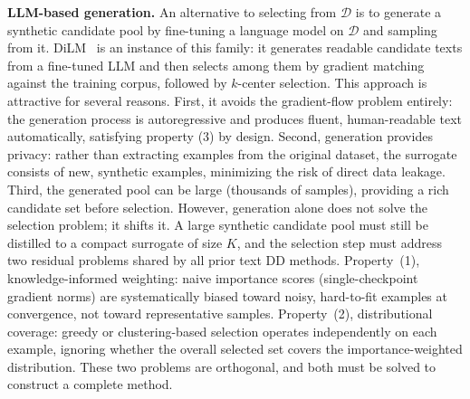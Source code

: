\begin{foldable}
  \textbf{\ac{LLM}-based generation.}
  An alternative to selecting from $\mathcal{D}$ is to generate a synthetic candidate pool by fine-tuning a language model on $\mathcal{D}$ and sampling from it.
  DiLM~\cite{maekawa2024dilm} is an instance of this family: it generates readable candidate texts from a fine-tuned \ac{LLM} and then selects among them by gradient matching against the training corpus, followed by $k$-center selection.
  This approach is attractive for several reasons.
  First, it avoids the gradient-flow problem entirely: the generation process is autoregressive and produces fluent, human-readable text automatically, satisfying property (3) by design.
  Second, generation provides privacy: rather than extracting examples from the original dataset, the surrogate consists of new, synthetic examples, minimizing the risk of direct data leakage.
  Third, the generated pool can be large (thousands of samples), providing a rich candidate set before selection.
  However, generation alone does not solve the selection problem; it shifts it.
  A large synthetic candidate pool must still be distilled to a compact surrogate of size $K$, and the selection step must address two residual problems shared by all prior text \ac{DD} methods.
  Property~(1), knowledge-informed weighting: naive importance scores (single-checkpoint gradient norms) are systematically biased toward noisy, hard-to-fit examples at convergence, not toward representative samples.
  Property~(2), distributional coverage: greedy or clustering-based selection operates independently on each example, ignoring whether the overall selected set covers the importance-weighted distribution.
  These two problems are orthogonal, and both must be solved to construct a complete method.
\end{foldable}
